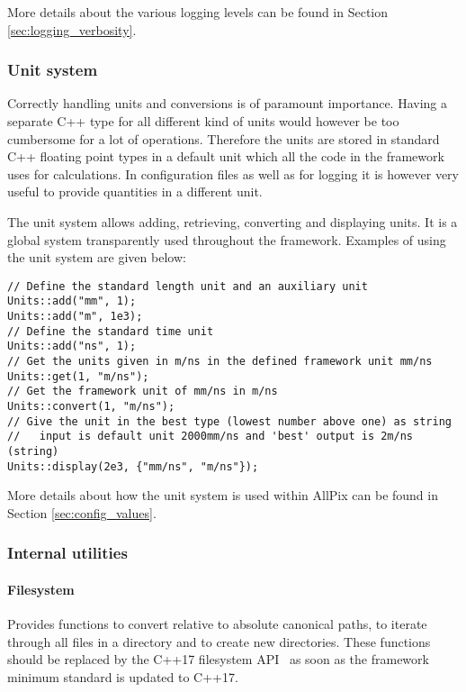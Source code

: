 More details about the various logging levels can be found in Section \ref{sec:logging_verbosity}.

\subsubsection{Unit system}
\label{sec:unit_system}
Correctly handling units and conversions is of paramount importance. Having a separate C++ type for all different kind of units would however be too cumbersome for a lot of operations. Therefore the units are stored in standard C++ floating point types in a default unit which all the code in the framework uses for calculations. In configuration files as well as for logging it is however very useful to provide quantities in a different unit.

The unit system allows adding, retrieving, converting and displaying units. It is a global system transparently used throughout the framework. Examples of using the unit system are given below:
\begin{verbatim}
// Define the standard length unit and an auxiliary unit
Units::add("mm", 1); 
Units::add("m", 1e3); 
// Define the standard time unit
Units::add("ns", 1); 
// Get the units given in m/ns in the defined framework unit mm/ns
Units::get(1, "m/ns"); 
// Get the framework unit of mm/ns in m/ns 
Units::convert(1, "m/ns");
// Give the unit in the best type (lowest number above one) as string 
//   input is default unit 2000mm/ns and 'best' output is 2m/ns (string)
Units::display(2e3, {"mm/ns", "m/ns"}); 
\end{verbatim}

More details about how the unit system is used within AllPix can be found in Section \ref{sec:config_values}.

\subsubsection{Internal utilities}
\paragraph{Filesystem}
\label{sec:filesystem}
Provides functions to convert relative to absolute canonical paths, to iterate through all files in a directory and to create new directories. These functions should be replaced by the C++17 filesystem API~\cite{cppfilesystem} as soon as the framework minimum standard is updated to C++17.

